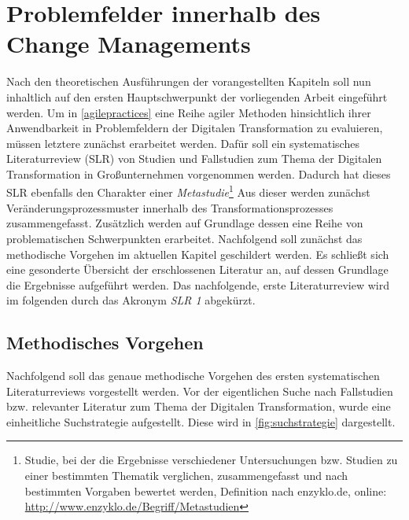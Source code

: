 \chapter{Problemfelder innerhalb des Change Managements}
\label{problemfields}


Nach den theoretischen Ausführungen der vorangestellten Kapiteln soll nun inhaltlich auf den ersten Hauptschwerpunkt der vorliegenden Arbeit eingeführt werden. Um in \ref{agilepractices} eine Reihe agiler Methoden hinsichtlich ihrer Anwendbarkeit in Problemfeldern der Digitalen Transformation zu evaluieren, müssen letztere zunächst erarbeitet werden. Dafür soll ein systematisches Literaturreview (\gls{SLR}) von Studien und Fallstudien zum Thema der Digitalen Transformation in Großunternehmen vorgenommen werden. Dadurch hat dieses SLR ebenfalls den Charakter einer \textit{Metastudie}\footnote{Studie, bei der die Ergebnisse verschiedener Untersuchungen bzw. Studien zu einer bestimmten Thematik verglichen, zusammengefasst und nach bestimmten Vorgaben bewertet werden, Definition nach enzyklo.de, online: \url{http://www.enzyklo.de/Begriff/Metastudien}} Aus dieser werden zunächst Veränderungsprozessmuster innerhalb des Transformationsprozesses  zusammengefasst.  Zusätzlich werden auf Grundlage dessen eine Reihe von problematischen Schwerpunkten erarbeitet. Nachfolgend soll zunächst das methodische Vorgehen im aktuellen Kapitel geschildert werden. Es schließt sich eine gesonderte Übersicht der erschlossenen Literatur an, auf dessen Grundlage  die Ergebnisse aufgeführt werden.  Das nachfolgende, erste Literaturreview wird im folgenden durch das Akronym \textit{SLR 1} abgekürzt.

\section{Methodisches Vorgehen}
\label{problemfields:methods}


Nachfolgend soll das genaue methodische Vorgehen des ersten systematischen Literaturreviews vorgestellt werden. Vor der eigentlichen Suche nach Fallstudien bzw. relevanter Literatur zum Thema der Digitalen Transformation, wurde eine einheitliche Suchstrategie aufgestellt. Diese wird in \ref{fig:suchstrategie} dargestellt. 

